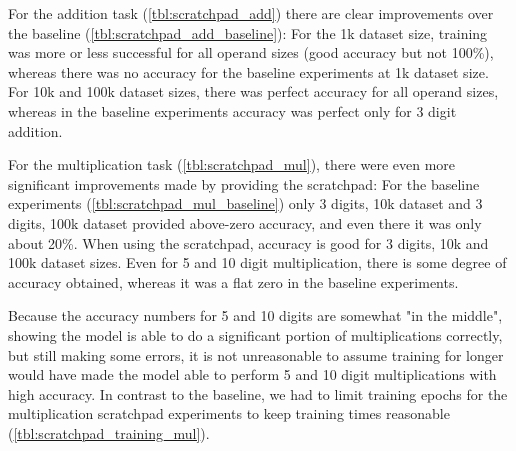 For the addition task  (\cref{tbl:scratchpad_add}) there are clear improvements over the baseline (\cref{tbl:scratchpad_add_baseline}): For the 1k dataset size, training was more or less successful for all operand sizes (good accuracy but not 100\%), whereas there was no accuracy for the baseline experiments at 1k dataset size.
For 10k and 100k dataset sizes, there was perfect accuracy for all operand sizes, whereas in the baseline experiments accuracy was perfect only for 3 digit addition.

\begin{table}[H]
	\begin{minipage}[t]{0.47\linewidth}
		\hfill
		\label{tbl:scratchpad_mul}
	\end{minipage}
	\hfill %
	\begin{minipage}[t]{0.47\linewidth}
		\hfill
		\label{tbl:scratchpad_mul_baseline}
	\end{minipage}
\end{table}


For the multiplication task (\cref{tbl:scratchpad_mul}), there were even more significant improvements made by providing the scratchpad: For the baseline experiments (\cref{tbl:scratchpad_mul_baseline}) only 3 digits, 10k dataset and 3 digits, 100k dataset provided above-zero accuracy, and even there it was only about 20\%. When using the scratchpad, accuracy is good for 3 digits, 10k and 100k dataset sizes.
Even for 5 and 10 digit multiplication, there is some degree of accuracy obtained, whereas it was a flat zero in the baseline experiments.

Because the accuracy numbers for 5 and 10 digits are somewhat "in the middle", showing the model is able to do a significant portion of multiplications correctly, but still making some errors, it is not unreasonable to assume training for longer would have made the model able to perform 5 and 10 digit multiplications with high accuracy. In contrast to the baseline, we had to limit training epochs for the multiplication scratchpad experiments to keep training times reasonable (\cref{tbl:scratchpad_training_mul}).

